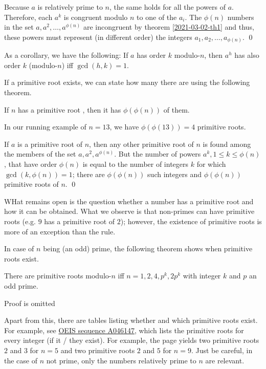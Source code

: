 Because $a$ is relatively prime to $n$, the same holds for all the powers of $a$. Therefore, each $a^k$ is congruent modulo $n$ to one of the $a_i$. The $\phi(n)$ numbers in the set $a, a^2, \ldots, a^{\phi(n)}$ are incongruent by theorem \ref{2021-03-02-th1} and thus, these powers must represent (in different order) the integers $a_1, a_2, \ldots, a_{\phi(n)}$. \qed

As a corollary, we have the following: If $a$ has order $k$ modulo-$n$, then $a^h$ has also order $k$ (modulo-$n$) iff $\gcd(h,k) = 1$.

If a primitive root exists, we can state how many there are using the following theorem.

\begin{theorem}
  If $n$ has a primitive root , then it has $\phi(\phi(n))$ of them.
\end{theorem}

In our running example of $n=13$, we have $\phi(\phi(13)) = 4$ primitive roots.

If $a$ is a primitive root of $n$, then any other primitive root of $n$ is found among the members of the set $a, a^2, a^{\phi(n)}$. But the number of powers $a^k, 1 \leq k \leq \phi(n)$, that have order $\phi(n)$ is equal to the number of integers $k$ for which $\gcd(k, \phi(n)) = 1$; there are $\phi(\phi(n))$ such integers and $\phi(\phi(n))$ primitive roots of $n$. \qed

WHat remains open is the question whether a number has a primitive root and how it can be obtained. What we observe is that non-primes can have primitive roots (e.g. $9$ has a primitive root of $2$); however, the existence of primitive roots is more of an exception than the rule.

In case of $n$ being (an odd) prime, the following theorem shows when primitive roots exist.

\begin{theorem}
  There are primitive roots modulo-$n$ iff $n=1,2,4, p^k, 2p^k$ with integer $k$ and $p$ an odd prime.
\end{theorem}

Proof is omitted 

Apart from this, there are tables listing whether and which primitive roots exist. For example, see \href{http://oeis.org/A046147}{OEIS sequence A046147}, which lists the primitive roots for every integer (if it / they exist). For example, the page yields two primitive roots $2$ and $3$ for $n=5$ and two primitive roots $2$ and $5$ for $n=9$. Just be careful, in the case of $n$ not prime, only the numbers relatively prime to $n$ are relevant.

